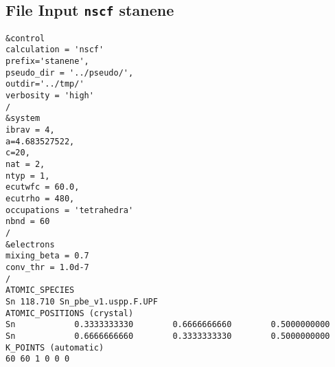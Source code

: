 \subsection{File Input \texttt{nscf} stanene}
\begin{lstlisting}
&control
calculation = 'nscf'
prefix='stanene',
pseudo_dir = '../pseudo/',
outdir='../tmp/'
verbosity = 'high'
/
&system
ibrav = 4,
a=4.683527522,
c=20,
nat = 2,
ntyp = 1,
ecutwfc = 60.0,
ecutrho = 480, 
occupations = 'tetrahedra'
nbnd = 60
/
&electrons
mixing_beta = 0.7
conv_thr = 1.0d-7
/
ATOMIC_SPECIES
Sn 118.710 Sn_pbe_v1.uspp.F.UPF
ATOMIC_POSITIONS (crystal)
Sn            0.3333333330        0.6666666660        0.5000000000
Sn            0.6666666660        0.3333333330        0.5000000000
K_POINTS (automatic)
60 60 1 0 0 0

\end{lstlisting}





